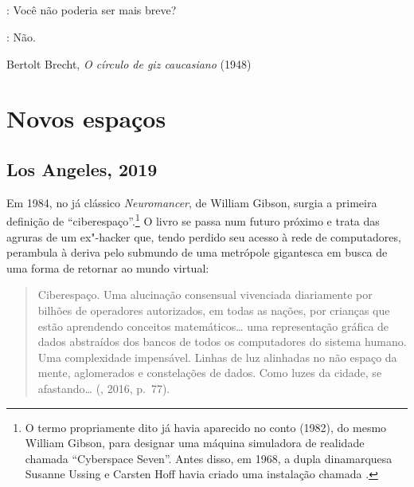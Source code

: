 \chapter*{}
\thispagestyle{empty}
\begin{vplace}[30]
: Você não poderia ser mais breve?

\noindent{}: Não.

Bertolt Brecht, \emph{O círculo de giz caucasiano} (1948)
\end{vplace}

\part{Novos espaços}

\chapter{Los Angeles, 2019}

Em 1984, no já clássico \emph{Neuromancer}, de William Gibson, surgia a
primeira definição de ``ciberespaço''.\footnote{O termo propriamente
  dito já havia aparecido no conto {} (1982), do
  mesmo William Gibson, para designar uma máquina simuladora de
  realidade chamada ``Cyberspace Seven''. Antes disso, em 1968, a dupla
  dinamarquesa Susanne Ussing e Carsten Hoff havia criado uma
  instalação chamada {}.} O livro se passa num
futuro próximo e trata das agruras de um ex"-hacker que, tendo perdido
seu acesso à rede de computadores, perambula à deriva pelo submundo de
uma metrópole gigantesca em busca de uma forma de retornar ao mundo
virtual:

\begin{quote}
Ciberespaço. Uma alucinação consensual vivenciada diariamente por
bilhões de operadores autorizados, em todas as nações, por crianças que
estão aprendendo conceitos matemáticos\ldots{} uma representação gráfica de
dados abstraídos dos bancos de todos os computadores do sistema humano.
Uma complexidade impensável. Linhas de luz alinhadas no não espaço da
mente, aglomerados e constelações de dados. Como luzes da cidade, se
afastando\ldots{} (, 2016, p.~77).
\end{quote}

